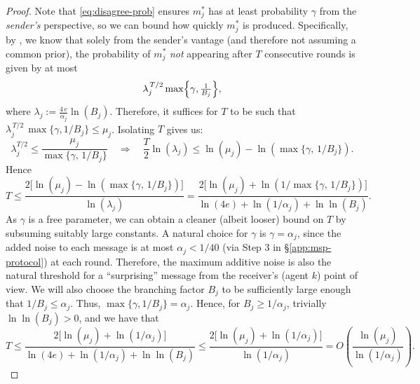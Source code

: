 \begin{proof}
Note that \eqref{eq:disagree-prob} ensures $m_j^*$ has at least probability
$\gamma$ from the \emph{sender’s} perspective, so we can bound how quickly
$m_j^*$ is produced.
Specifically, by \citet[Lemma 15]{aaronson2005complexity}, we know that solely from the sender's vantage (and therefore not assuming a common prior), the probability of $m_j^*$ \emph{not} appearing after $T$ consecutive rounds is given by at most
\begin{equation*}
\lambda_j^{\,T/2}\max\Bigl\{\gamma,\tfrac{1}{B_j}\Bigr\},
\end{equation*}
where $\lambda_j := \frac{4\,e}{\alpha_j}\ln\left(B_j\right)$.
Therefore, it suffices for $T$ to be such that $\lambda_j^{\,T/2}\,\max\{\gamma,1/B_j\} \le \mu_j$. 
Isolating $T$ gives us:
\begin{equation*}
  \lambda_j^{T/2} \le \frac{\mu_j}{\max\{\gamma,\,1/B_j\}}
  \quad\Longrightarrow\quad
  \frac{T}{2}\ln\left(\lambda_j\right) \le \ln\left(\mu_j\right) - \ln\left(\max\{\gamma,\,1/B_j\}\right).
\end{equation*}
Hence
\begin{equation*}
T \le \frac{2\bigl[\ln\left(\mu_j\right) - \ln\left(\max\{\gamma,\,1/B_j\}\right)\bigr]}{\ln\left(\lambda_j\right)} = \frac{2\bigl[\ln\left(\mu_j\right) + \ln\left(1/\max\{\gamma,\,1/B_j\}\right)\bigr]}{\ln(4e) + \ln(1/\alpha_j) + \ln\ln\left(B_j\right)}.
\end{equation*}
As $\gamma$ is a free parameter, we can obtain a cleaner (albeit looser) bound on $T$ by subsuming suitably large constants.
A natural choice for $\gamma$ is $\gamma = \alpha_j$, since the added noise to each message is at most $\alpha_j < 1/40$ (via Step 3 in \S\ref{app:msp-protocol}) at each round.
Therefore, the maximum additive noise is also the natural threshold for a ``surprising'' message from the receiver's (agent $k$) point of view.
We will also choose the branching factor $B_j$ to be sufficiently large enough that $1/B_j \le \alpha_j$.
Thus, $\max\{\gamma,1/B_j\} = \alpha_j$.
Hence, for $B_j \ge 1/\alpha_j$, trivially $\ln\ln\left(B_j\right) > 0$, and we have that
\begin{equation*}
T \le \frac{2\bigl[\ln\left(\mu_j\right) + \ln\left(1/\alpha_j\right)\bigr]}{\ln(4e) + \ln(1/\alpha_j) + \ln\ln\left(B_j\right)} \le \frac{2\bigl[\ln\left(\mu_j\right) + \ln\left(1/\alpha_j\right)\bigr]}{\ln(1/\alpha_j)} = O\left(\frac{\ln\left(\mu_j\right)}{\ln\left(1/\alpha_j\right)}\right).
\end{equation*}
\end{proof}

